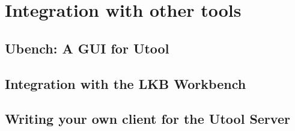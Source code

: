\section{Integration with other tools}  \label{sec:integration}


\subsection{Ubench: A GUI for Utool}

\subsection{Integration with the LKB Workbench}
\label{sec:integration-lkb}

\subsection{Writing your own client for the Utool Server}



